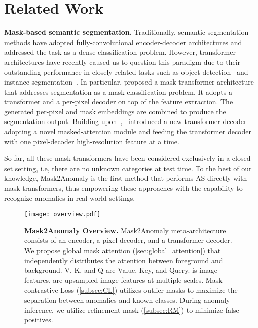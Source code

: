 \documentclass[10pt,twocolumn,letterpaper]{article}
\newcommand{\myparagraph}[1]{\vspace{3pt}\noindent\textbf{#1}}
\begin{document}
\section{Related Work}
\label{sec:related}
\myparagraph{Mask-based semantic segmentation.}
Traditionally, semantic segmentation methods \cite{long2015fully, chen2018encoder, zhao2017pyramid, lin2017refinenet, zhang2018exfuse} have adopted fully-convolutional encoder-decoder architectures \cite{long2015fully, badrinarayanan2017segnet} and addressed the task as a dense classification problem. 
However, transformer architectures have recently caused us to question this paradigm due to their outstanding performance in closely related tasks such as object detection~\cite{carion2020end} and instance segmentation~\cite{he2017mask}. In particular, \cite{cheng2021per} proposed a mask-transformer architecture that addresses segmentation as a mask classification problem. It adopts a transformer and a per-pixel decoder on top of the feature extraction. The generated per-pixel and mask embeddings are combined to produce the segmentation output. Building upon~\cite{cheng2021per},~\cite{cheng2022masked} introduced a new transformer decoder adopting a novel masked-attention module and feeding the transformer decoder with one pixel-decoder high-resolution feature at a time. 

So far, all these mask-transformers have been considered exclusively in a closed set setting, i.e, there are no unknown categories at test time. 
To the best of our knowledge, Mask2Anomaly is the first method that performs AS directly with mask-transformers, thus empowering these approaches with the capability to recognize anomalies in real-world settings.


\begin{figure*}[t]
\begin{center}

\texttt{[image: overview.pdf]}
\end{center}
\vspace{-1em}
  \caption{\textbf{Mask2Anomaly Overview.} Mask2Anomaly meta-architecture consists of an encoder, a pixel decoder, and a transformer decoder. We propose global mask attention (\cref{sec:global_attention}) that independently distributes the attention between foreground and background. V, K, and Q are Value, Key, and Query.  is image features.  are upsampled image features at multiple scales. Mask contrastive Loss  (\cref{subsec:CL}) utilizes outlier masks to maximize the separation between anomalies and known classes. During anomaly inference, we utilize refinement mask  (\cref{subsec:RM}) to minimize false positives.} \vspace{-1em}
\label{fig:overview}
\end{figure*}
\end{document}
